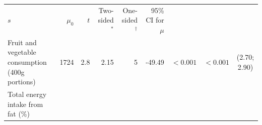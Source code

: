 \documentclass[11pt,a4paper,openany]{book}
\begin{document}
\begin{longtable}[]{@{}lrrrrrrrc@{}}
\begin{minipage}[t]{0.03\columnwidth}
\(s\)\strut
\end{minipage} & \begin{minipage}[t]{0.05\columnwidth}\raggedleft\strut
\(\mu_{0}\)\strut
\end{minipage} & \begin{minipage}[t]{0.03\columnwidth}\raggedleft\strut
\(t\)\strut
\end{minipage} & \begin{minipage}[t]{0.13\columnwidth}\raggedleft\strut
Two- sided\(^{*}\)\strut
\end{minipage} & \begin{minipage}[t]{0.08\columnwidth}\raggedleft\strut
One- sided\(^{\dagger}\)\strut
\end{minipage} & \begin{minipage}[t]{0.06\columnwidth}\centering\strut
95\% CI for \(\mu\)\strut
\end{minipage}\tabularnewline
\begin{minipage}[t]{0.30\columnwidth}\raggedright\strut
Fruit and vegetable consumption (400g portions)\strut
\end{minipage} & \begin{minipage}[t]{0.04\columnwidth}\raggedleft\strut
1724\strut
\end{minipage} & \begin{minipage}[t]{0.05\columnwidth}\raggedleft\strut
2.8\strut
\end{minipage} & \begin{minipage}[t]{0.03\columnwidth}\raggedleft\strut
2.15\strut
\end{minipage} & \begin{minipage}[t]{0.05\columnwidth}\raggedleft\strut
5\strut
\end{minipage} & \begin{minipage}[t]{0.03\columnwidth}\raggedleft\strut
-49.49\strut
\end{minipage} & \begin{minipage}[t]{0.13\columnwidth}\raggedleft\strut
\(<0.001\)\strut
\end{minipage} & \begin{minipage}[t]{0.08\columnwidth}\raggedleft\strut
\(<0.001\)\strut
\end{minipage} & \begin{minipage}[t]{0.06\columnwidth}\centering\strut
(2.70; 2.90)\strut
\end{minipage}\tabularnewline
\begin{minipage}[t]{0.30\columnwidth}\raggedright\strut
Total energy intake from fat (\%)\strut

\end{minipage}
\end{longtable}
\end{document}
